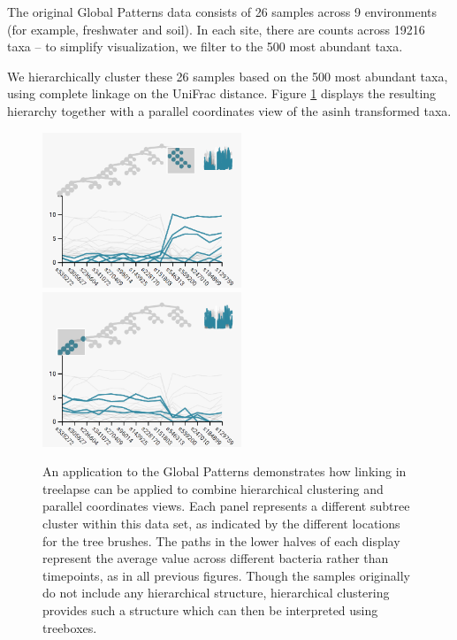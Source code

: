 \documentclass[12pt]{article}
\begin{document}
The original Global Patterns data consists of 26 samples across 9
environments (for example, freshwater and soil). In each site, there are
counts across 19216 taxa -- to simplify visualization, we filter to the
500 most abundant taxa.

We hierarchically cluster these 26 samples based on the 500 most
abundant taxa, using complete linkage on the UniFrac distance. Figure
\ref{fig:gptimebox} displays the resulting hierarchy together with a
parallel coordinates view of the \(\text{asinh}\) transformed taxa.

\begin{figure}
  {
    \centering
    \includegraphics[width=225px]{figure/gp_cluster1}
    \includegraphics[width=225px]{figure/gp_cluster2}
}

\caption{An application to the Global Patterns demonstrates how linking in
  treelapse can be applied to combine hierarchical clustering and parallel
  coordinates views. Each panel represents a different subtree cluster within
  this data set, as indicated by the different locations for the tree brushes.
  The paths in the lower halves of each display represent the average value
  across different bacteria rather than timepoints, as in all previous figures.
  Though the samples originally do not include any hierarchical structure,
  hierarchical clustering provides such a structure which can then be
  interpreted using treeboxes.}\label{fig:gptimebox}
\end{figure}
\end{document}

